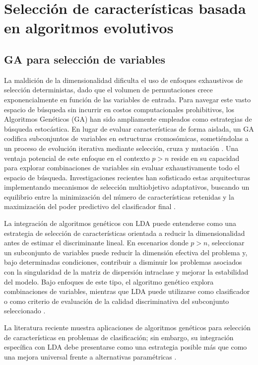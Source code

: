 \section{Selección de características basada en algoritmos evolutivos}

\subsection{GA para selección de variables}

La maldición de la dimensionalidad dificulta el uso de enfoques exhaustivos de selección deterministas, dado que el volumen de permutaciones crece exponencialmente en función de las variables de entrada. Para navegar este vasto espacio de búsqueda sin incurrir en costos computacionales prohibitivos, los Algoritmos Genéticos (GA) han sido ampliamente empleados como estrategias de búsqueda estocástica. En lugar de evaluar características de forma aislada, un GA codifica subconjuntos de variables en estructuras cromosómicas, sometiéndolas a un proceso de evolución iterativa mediante selección, cruza y mutación \cite{al2021population}. Una ventaja potencial de este enfoque en el contexto $p>n$ reside en su capacidad para explorar combinaciones de variables sin evaluar exhaustivamente todo el espacio de búsqueda. Investigaciones recientes han sofisticado estas arquitecturas implementando mecanismos de selección multiobjetivo adaptativos, buscando un equilibrio entre la minimización del número de características retenidas y la maximización del poder predictivo del clasificador final \cite{wang2026improved}.

La integración de algoritmos genéticos con LDA puede entenderse como una estrategia de selección de características orientada a reducir la dimensionalidad antes de estimar el discriminante lineal. En escenarios donde $p>n$, seleccionar un subconjunto de variables puede reducir la dimensión efectiva del problema y, bajo determinadas condiciones, contribuir a disminuir los problemas asociados con la singularidad de la matriz de dispersión intraclase y mejorar la estabilidad del modelo. Bajo enfoques de este tipo, el algoritmo genético explora combinaciones de variables, mientras que LDA puede utilizarse como clasificador o como criterio de evaluación de la calidad discriminativa del subconjunto seleccionado \cite{lara2025feature}.

La literatura reciente muestra aplicaciones de algoritmos genéticos para selección de características en problemas de clasificación; sin embargo, su integración específica con LDA debe presentarse como una estrategia posible más que como una mejora universal frente a alternativas paramétricas \cite{freire2025nuclear,ali2021lda}.



